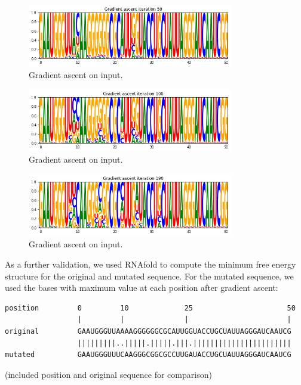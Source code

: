 \documentclass{proposal}
\begin{document}
\begin{figure}[h!]
    \centering
    \includegraphics[width=0.8\textwidth]{plot/base_pair_ga_50.png}
    \caption{Gradient ascent on input.}
    \label{fig:base_pair_ga_50}
    \centering
\end{figure}

\begin{figure}[h!]
    \centering
    \includegraphics[width=0.8\textwidth]{plot/base_pair_ga_100.png}
    \caption{Gradient ascent on input.}
    \label{fig:base_pair_ga_100}
    \centering
\end{figure}

\begin{figure}[h!]
    \centering
    \includegraphics[width=0.8\textwidth]{plot/base_pair_ga_190.png}
    \caption{Gradient ascent on input.}
    \label{fig:base_pair_ga_190}
    \centering
\end{figure}


As a further validation, we used RNAfold to compute the minimum free energy structure for the original and mutated sequence.
For the mutated sequence, we used the bases with maximum value at each position after gradient ascent:

\begin{verbatim}
position         0         10             25                      50
                 |         |              |                       |
original         GAAUGGGUUAAAAGGGGGGCGCAUUGGUACCUGCUAUUAGGGAUCAAUCG
                 |||||||||..|||||.|||||.|||.|||||||||||||||||||||||
mutated          GAAUGGGUUUCAAGGGCGGCGCCUUGAUACCUGCUAUUAGGGAUCAAUCG
\end{verbatim}
(included position and original sequence for comparison)
\end{document}
